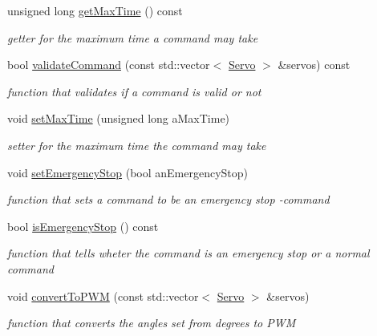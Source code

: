 \begin{DoxyCompactItemize}
unsigned long \hyperlink{classRobotInterface_1_1HighLevel_1_1Command_aa4379f7948d970982971a780a928b1dc}{get\+Max\+Time} () const 
\begin{DoxyCompactList}\small\item\em getter for the maximum time a command may take \end{DoxyCompactList}\item 
bool \hyperlink{classRobotInterface_1_1HighLevel_1_1Command_ab42a68a2e06de9284b4c5b3ace882944}{validate\+Command} (const std\+::vector$<$ \hyperlink{classRobotInterface_1_1HighLevel_1_1Servo}{Servo} $>$ \&servos) const 
\begin{DoxyCompactList}\small\item\em function that validates if a command is valid or not \end{DoxyCompactList}\item 
void \hyperlink{classRobotInterface_1_1HighLevel_1_1Command_a232461097b931e8a6da3f6fab7239966}{set\+Max\+Time} (unsigned long a\+Max\+Time)
\begin{DoxyCompactList}\small\item\em setter for the maximum time the command may take \end{DoxyCompactList}\item 
void \hyperlink{classRobotInterface_1_1HighLevel_1_1Command_a7d4affca585c500be531f71794a94dc2}{set\+Emergency\+Stop} (bool an\+Emergency\+Stop)
\begin{DoxyCompactList}\small\item\em function that sets a command to be an emergency stop -\/command \end{DoxyCompactList}\item 
bool \hyperlink{classRobotInterface_1_1HighLevel_1_1Command_a02db6fe5f69006176486b1571b16dd51}{is\+Emergency\+Stop} () const 
\begin{DoxyCompactList}\small\item\em function that tells wheter the command is an emergency stop or a normal command \end{DoxyCompactList}\item 
void \hyperlink{classRobotInterface_1_1HighLevel_1_1Command_a5e7204c42507aa8c2f909703f0a7ef2e}{convert\+To\+P\+WM} (const std\+::vector$<$ \hyperlink{classRobotInterface_1_1HighLevel_1_1Servo}{Servo} $>$ \&servos)
\begin{DoxyCompactList}\small\item\em function that converts the angles set from degrees to P\+WM \end{DoxyCompactList}\item 

\end{DoxyCompactItemize}
